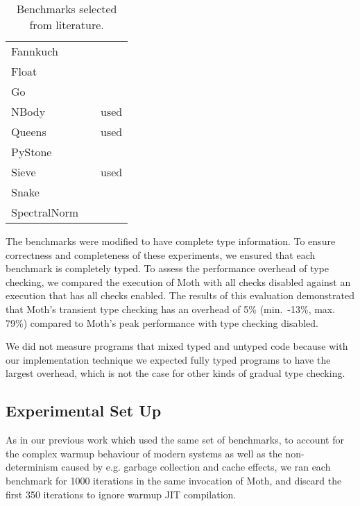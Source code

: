 \documentclass[sigplan,10pt,review,screen]{acmart}\settopmatter{printfolios=true}
\newcommand{\eg}{e.g.\xspace}
\begin{document}
\begin{table}[htb]
  \caption{Benchmarks selected from literature.}
  \label{tab:gradual-benchmarks}
  \begin{center}
    \begin{tabular}{l l r}
      Fannkuch & \cite{Vitousek2017,Greenman2018} \\
      Float & \cite{Vitousek2017,Muehlboeck2017,Greenman2018} \\
      Go & \cite{Vitousek2017,Muehlboeck2017,Greenman2018} \\
      NBody & \cite{Kuhlenschmidt:2018:preprint,Vitousek2017,Greenman2018} & used \cite{Marr2016} \\
      Queens & \cite{Vitousek2017,Muehlboeck2017,Greenman2018} & used \cite{Marr2016} \\
      PyStone & \cite{Vitousek2017,Muehlboeck2017,Greenman2018} \\
      Sieve & \cite{Takikawa2016,Muehlboeck2017,Bauman2017,Richards2017,Greenman2019jfp} & used \cite{Marr2016} \\
      Snake & \cite{Takikawa2016,Muehlboeck2017,Bauman2017,Richards2017,Greenman2019jfp} \\
      SpectralNorm & \cite{Vitousek2017,Muehlboeck2017,Greenman2018} \\
    \end{tabular}
  \end{center}
\end{table}

The benchmarks were modified to have complete type information.  To
ensure correctness and completeness of these experiments, we ensured that each benchmark is completely typed.  To assess the performance
overhead of type checking, we compared the execution of Moth with all
checks disabled against an execution that has all checks enabled.  The
results of this evaluation demonstrated that Moth's transient type checking has an overhead of 5\% (min.\ -13\%,
max. 79\%) compared to Moth's peak performance with type checking disabled.

We did not measure programs that mixed typed and untyped code because
with our implementation technique we expected fully typed programs to
have the largest overhead, which is not the case for other kinds of
gradual type checking.

\subsection{Experimental Set Up}
As in our previous work \cite{roberts-and-co-ecoop-2019} which used the same set of benchmarks, to account for the complex warmup behaviour of modern systems \citep{Barrett:2017:VMW} as well as
the non-determinism caused by \eg garbage collection and cache effects, we ran each benchmark for 1000 iterations in the same invocation of Moth, and discard the first 350 iterations to ignore warmup JIT compilation.
\end{document}
